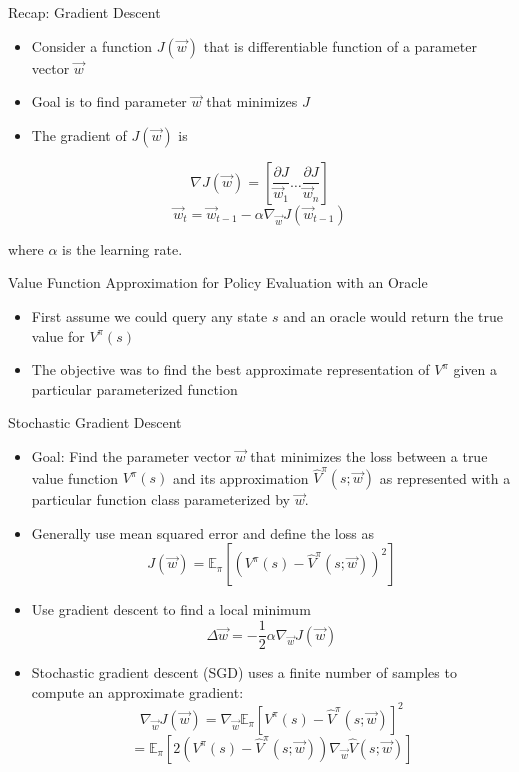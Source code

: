 \documentclass[aspectratio=169]{../latex_main/tntbeamer}  %
\begin{document}
\begin{frame}[c]{Recap: Gradient Descent}
	
	
	\begin{itemize}
		\item Consider a function $J(\vec{w})$ that is differentiable function of a parameter vector $\vec{w}$
		\item Goal is to find parameter $\vec{w}$ that minimizes $J$
		\item The gradient of $J(\vec{w})$ is 
	\end{itemize}
	$$
	\nabla J(\vec{w}) = \left[ \frac{\partial J}{\vec{w}_1} \ldots \frac{\partial J}{\vec{w}_n} \right]
	$$
	$$\vec{w}_t = \vec{w}_{t-1} - \alpha \nabla_{\vec{w}} J(\vec{w}_{t-1})$$
	
	where $\alpha$ is the learning rate.

	
\end{frame}
\begin{frame}[c]{Value Function Approximation for Policy Evaluation with
		an Oracle}
	
	
	\begin{itemize}
		\item First assume we could query any state $s$ and an \alert{oracle} would return
		the true value for $V^\pi (s)$
		\item The objective was to find the best approximate representation of $V^\pi$
		given a particular parameterized function
	\end{itemize}
	
\end{frame}
\begin{frame}[c]{Stochastic Gradient Descent}
	
	
	\begin{itemize}
		\item Goal: Find the parameter vector $\vec{w}$ that minimizes the loss between a
		true value function $V^\pi(s)$ and its approximation $\hat{V}^\pi(s; \vec{w})$ as
		represented with a particular function class parameterized by $\vec{w}$.
		\item Generally use mean squared error and define the loss as 
		$$ J(\vec{w}) = \mathbb{E}_\pi [(V^\pi(s) - \hat{V}^\pi(s;\vec{w}))^2]$$
		\item Use gradient descent to find a local minimum 
		$$ \Delta \vec{w} = - \frac{1}{2} \alpha \nabla_\vec{w} J(\vec{w})$$
		\item Stochastic gradient descent (SGD) uses a finite number of samples to compute an approximate gradient:
		$$ \nabla_\vec{w} J(\vec{w}) = \nabla_{\vec{w}} \mathbb{E}_\pi[V^\pi (s) - \hat{V}^\pi (s; \vec{w})]^2$$
		$$= \mathbb{E}_\pi [2 (V^\pi(s) - \hat{V}^\pi (s;\vec{w})) \nabla_\vec{w} \hat{V}(s;\vec{w})]$$
	\end{itemize}
	
\end{frame}
\end{document}
